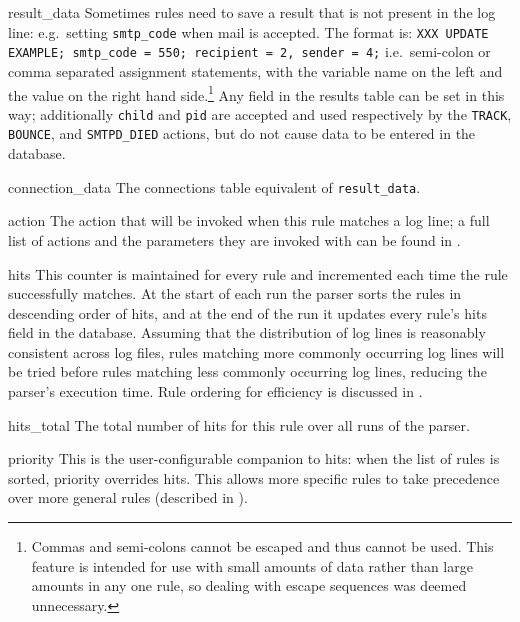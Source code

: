 \begin{eqlist}
    \item [result\_data] Sometimes rules need to save a result that is not
        present in the log line: e.g.\ setting \texttt{smtp\_code} when
        mail is accepted.  The format is: \newline{} \tab{} \texttt{XXX
        UPDATE EXAMPLE\@; smtp\_code = 550; \newline{} recipient = 2,
        sender = 4;} \newline{} i.e.\ semi-colon or comma separated
        assignment statements, with the variable name on the left and the
        value on the right hand side.\footnote{Commas and semi-colons
        cannot be escaped and thus cannot be used.  This feature is
        intended for use with small amounts of data rather than large
        amounts in any one rule, so dealing with escape sequences was
        deemed unnecessary.}  Any field in the results table can be set in
        this way; additionally \texttt{child} and \texttt{pid} are accepted
        and used respectively by the \texttt{TRACK}, \texttt{BOUNCE}, and
        \texttt{SMTPD\_DIED} actions, but do not cause data to be entered
        in the database.

    \item [connection\_data] The connections table equivalent of
        \texttt{result\_data}.

    \item [action] The action that will be invoked when this rule matches a
        log line; a full list of actions and the parameters they are
        invoked with can be found in .

    \item [hits] This counter is maintained for every rule and incremented
        each time the rule successfully matches.  At the start of each run
        the parser sorts the rules in descending order of hits, and at the
        end of the run it updates every rule's hits field in the database.
        Assuming that the distribution of log lines is reasonably
        consistent across log files, rules matching more commonly occurring
        log lines will be tried before rules matching less commonly
        occurring log lines, reducing the parser's execution time.  Rule
        ordering for efficiency is discussed in .

    \item [hits\_total] The total number of hits for this rule over all
        runs of the parser.

    \item [priority] This is the user-configurable companion to hits: when
        the list of rules is sorted, priority overrides hits.  This allows
        more specific rules to take precedence over more general rules
        (described in ).


\end{eqlist}

